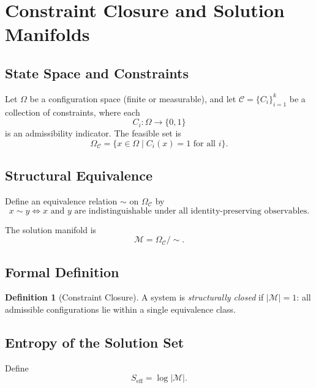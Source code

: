 \documentclass[11pt, twoside]{article}
\theoremstyle{plain}
\theoremstyle{definition}
\newtheorem{definition}[theorem]{Definition}
\theoremstyle{remark}
\newcommand{\OmC}{\Omega_{\mathcal{C}}}
\newcommand{\Seff}{S_{\text{eff}}}
\begin{document}
\appendix
\renewcommand{\thesection}{\Alph{section}}

\section{Constraint Closure and Solution Manifolds}
\label{app:closure}

\subsection{State Space and Constraints}

Let $\Omega$ be a configuration space (finite or measurable), and let $\mathcal{C} = \{C_i\}_{i=1}^k$ be a collection of constraints, where each
\[
C_i : \Omega \to \{0,1\}
\]
is an admissibility indicator. The feasible set is
\[
\OmC = \{ x \in \Omega \mid C_i(x) = 1 \text{ for all } i \}.
\]

\subsection{Structural Equivalence}

Define an equivalence relation $\sim$ on $\OmC$ by
\[
x \sim y \iff x \text{ and } y \text{ are indistinguishable under all identity-preserving observables.}
\]

The solution manifold is
\[
\mathcal{M} = \OmC / {\sim}.
\]

\subsection{Formal Definition}

\begin{definition}[Constraint Closure]
A system is \emph{structurally closed} if $|\mathcal{M}| = 1$: all admissible configurations lie within a single equivalence class.
\end{definition}

\subsection{Entropy of the Solution Set}

Define
\[
\Seff = \log |\mathcal{M}|.
\]
\end{document}
